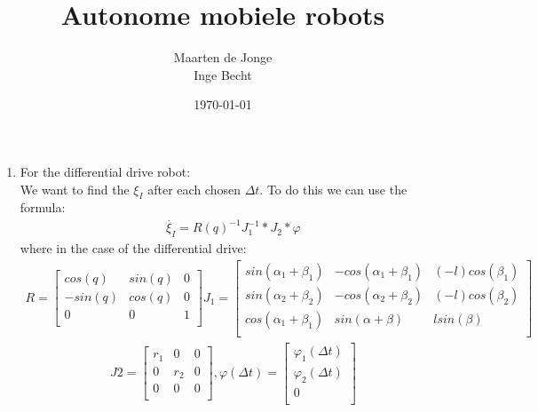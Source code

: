 \documentclass[a4paper, 20pt]{report}
\author{Maarten de Jonge \\
Inge Becht}
\date{\today}
\title{Autonome mobiele robots}
\begin{document}
\maketitle

\begin{enumerate}
    \item For the differential drive robot:\\
        We want to find the $\xi_I$ after each chosen $\Delta t$.
        To do this we can use the formula:
        \begin{align*}
            \dot{\xi_I} = R(q)^{-1}J_1^{-1} *J_2*\varphi
        \end{align*}
        where in the case of the differential drive:
        \begin{align*}
            R = \begin{bmatrix}
                cos(q) & sin(q) & 0           \\[0.3em]
                -sin(q) & cos(q)& 0           \\[0.3em]
                0 & 0 & 1\\
            \end{bmatrix}
            J_1 =
            \begin{bmatrix}
                sin(\alpha_1 + \beta_1)  &-cos(\alpha_1 + \beta_1) & (-l)cos(\beta_1)\\
                sin(\alpha_2 + \beta_2)  &-cos(\alpha_2 + \beta_2) & (-l)cos(\beta_2)\\
                cos(\alpha_1 + \beta_1) & sin(\alpha + \beta)    &   lsin(\beta) \\
            \end{bmatrix}
        \end{align*}
        \begin{align*}
            J2 = 
            \begin{bmatrix}
                r_1 & 0 & 0 \\
                0 & r_2 & 0 \\
                0 & 0 & 0\\
            \end{bmatrix},
            \varphi(\Delta t) = 
            \begin{bmatrix}
                \varphi_1(\Delta t) \\
                \varphi_2(\Delta t )\\ 
                0\\
            \end{bmatrix}

\end{align*}
\end{enumerate}
\end{document}
